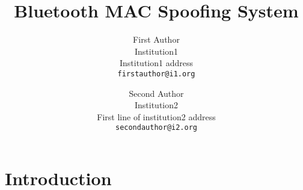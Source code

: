 \documentclass[10pt,twocolumn,letterpaper]{article}
\begin{document}
\title{Bluetooth MAC Spoofing System}

\author{First Author\\
Institution1\\
Institution1 address\\
{\tt\small firstauthor@i1.org}
\and
Second Author\\
Institution2\\
First line of institution2 address\\
{\tt\small secondauthor@i2.org}
}

\maketitle

\begin{abstract}
   
\end{abstract}

\section{Introduction}


\end{document}
